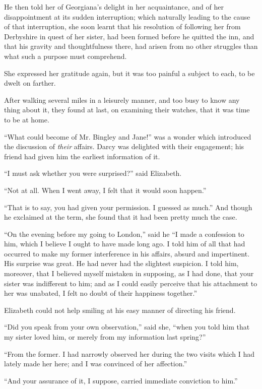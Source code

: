 He then told her of Georgiana’s delight in her acquaintance,
and of her disappointment at its sudden interruption;
which naturally leading to the cause of that
interruption, she soon learnt that his resolution of following
her from Derbyshire in quest of her sister, had been
formed before he quitted the inn, and that his gravity
and thoughtfulness there, had arisen from no other
struggles than what such a purpose must comprehend.

She expressed her gratitude again, but it was too
painful a subject to each, to be dwelt on farther.

After walking several miles in a leisurely manner, and
too busy to know any thing about it, they found at last, on
examining their watches, that it was time to be at home.

“What could become of Mr. Bingley and Jane!”
was a wonder which introduced the discussion of \textit{their}
affairs. Darcy was delighted with their engagement; his
friend had given him the earliest information of it.

“I must ask whether you were surprised?” said
Elizabeth.

“Not at all. When I went away, I felt that it would
soon happen.”

“That is to say, you had given your permission. I
guessed as much.” And though he exclaimed at the term,
she found that it had been pretty much the case.

“On the evening before my going to London,” said he
“I made a confession to him, which I believe I ought to
have made long ago. I told him of all that had occurred
to make my former interference in his affairs, absurd
and impertinent. His surprise was great. He had never
had the slightest suspicion. I told him, moreover, that
I believed myself mistaken in supposing, as I had done,
that your sister was indifferent to him; and as I could
easily perceive that his attachment to her was unabated,
I felt no doubt of their happiness together.”

Elizabeth could not help smiling at his easy manner of
directing his friend.

“Did you speak from your own observation,” said she,
“when you told him that my sister loved him, or merely
from my information last spring?”

“From the former. I had narrowly observed her during
the two visits which I had lately made her here; and
I was convinced of her affection.”

“And your assurance of it, I suppose, carried immediate
conviction to him.”


